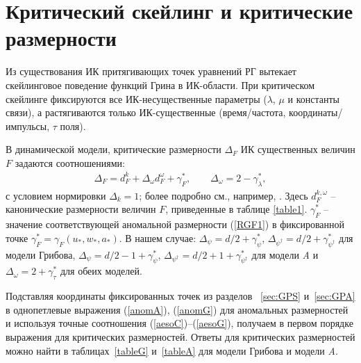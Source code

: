 \documentclass[a4paper,10pt]{article}
\begin{document}
\section{Критический скейлинг и критические размерности} \label{sec:DimeNS}

Из существования ИК притягивающих точек уравнений РГ вытекает скейлинговое поведение функций Грина в ИК-области.
При критическом скейлинге фиксируются все ИК-несущественные параметры  ($\lambda$, $\mu$ и константы связи), а
 растягиваются только ИК-существенные (время/частота, координаты/импульсы, $\tau$ поля).

В динамической модели, критические размерности $\Delta_{F}$  ИК существенных величин $F$ задаются соотношениями:
 \begin{eqnarray}
\Delta_{F} = d^{k}_{F}+ \Delta_{\omega} d^{\omega}_{F} + \gamma_{F}^{*},
\qquad  \Delta_{\omega}=2 -\gamma_{\lambda}^{*},
\label{dim}
\end{eqnarray}
с условием нормировки  $\Delta_{k} = 1$; более подробно см., например, \cite{Book3}.
Здесь $d^{k,\omega}_{F}$ -- канонические размерности величин $F$, приведенные в таблице \ref{table1}.
 $\gamma_{F}^{*}$ -- значение соответствующей аномальной размерности (\ref{RGF1}) в фиксированной точке $\gamma_{F}^{*} = \gamma_{F} (u_{*},w_{*},a_{*})$.
В нашем случае:
$\Delta_{\psi} = d/2+ \gamma_{\psi}^{*}$,
$\Delta_{\psi^{\dag}} = d/2+ \gamma_{\psi^{\dag}}^{*}$ для модели Грибова,
$\Delta_{\psi} = d/2-1+ \gamma_{\psi}^{*}$,
$\Delta_{\psi^{\dag}} = d/2+1+ \gamma_{\psi^{\dag}}^{*}$ для модели 
{\it A} и $\Delta_{\omega} = 2 + \gamma_{\tau}^{*}$ для обеих моделей.

Подставляя координаты фиксированных точек из разделов ~\ref{sec:GPS}
и~\ref{sec:GPA} в однопетлевые выражения (\ref{anomA}),
(\ref{anomG}) для аномальных размерностей и используя точные соотношения  (\ref{aesoC})--(\ref{aesoG}), получаем в первом порядке выражения для критических размерностей.
Ответы для критических размерностей можно найти в таблицах~\ref{tableG}
и~\ref{tableA} для модели Грибова и модели  {\it A}.
\end{document}
